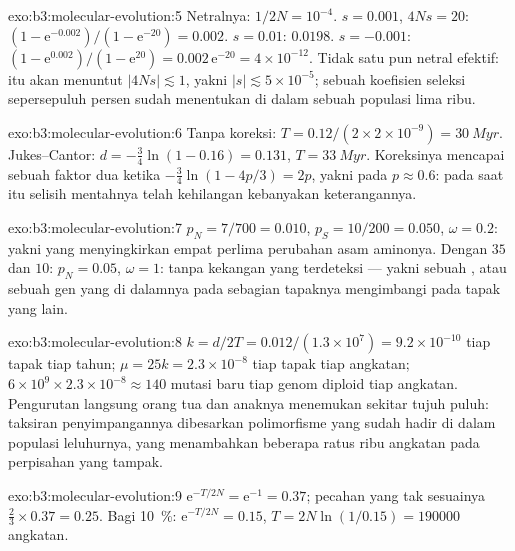 \begin{solution}{exo:b3:molecular-evolution:5}
Netralnya: $1/2N = 10^{-4}$. $s = 0.001$, $4Ns = 20$: $(1 - \mathrm{e}^{-0.002})/
(1 - \mathrm{e}^{-20}) = 0.002$. $s = 0.01$: $0.0198$. $s = -0.001$: $(1 -
\mathrm{e}^{0.002})/(1 - \mathrm{e}^{20}) = 0.002\,\mathrm{e}^{-20} =
4\times 10^{-12}$. Tidak satu pun netral efektif: itu akan menuntut $|4Ns|
\lesssim 1$, yakni $|s| \lesssim 5\times 10^{-5}$; sebuah koefisien
seleksi sepersepuluh persen sudah menentukan di dalam sebuah
populasi lima ribu.
\end{solution}

\begin{solution}{exo:b3:molecular-evolution:6}
Tanpa koreksi: $T = 0.12/(2\times 2\times 10^{-9}) = \qty{30}{Myr}$.
Jukes--Cantor: $d = -\tfrac{3}{4}\ln(1 - 0.16) = 0.131$, $T =
\qty{33}{Myr}$. Koreksinya mencapai sebuah faktor dua ketika $-\tfrac{3}{4}
\ln(1 - 4p/3) = 2p$, yakni pada $p \approx 0.6$: pada saat itu selisih mentahnya telah
kehilangan kebanyakan keterangannya.
\end{solution}

\begin{solution}{exo:b3:molecular-evolution:7}
$p_{N} = 7/700 = 0.010$, $p_{S} = 10/200 = 0.050$, $\omega = 0.2$:
yakni  yang menyingkirkan empat perlima perubahan asam aminonya. Dengan
$35$ dan $10$: $p_{N} = 0.05$, $\omega = 1$: tanpa kekangan yang terdeteksi ---
yakni sebuah , atau sebuah gen yang di dalamnya  pada sebagian tapaknya
mengimbangi  pada tapak yang lain.
\end{solution}

\begin{solution}{exo:b3:molecular-evolution:8}
$k = d/2T = 0.012/(1.3\times 10^{7}) = 9.2\times 10^{-10}$ tiap tapak tiap
tahun; $\mu = 25k = 2.3\times 10^{-8}$ tiap tapak tiap angkatan; $6\times
10^{9}\times 2.3\times 10^{-8} \approx 140$ mutasi baru tiap genom
diploid tiap angkatan. Pengurutan langsung orang tua dan anaknya menemukan
sekitar tujuh puluh: taksiran penyimpangannya dibesarkan polimorfisme
yang sudah hadir di dalam populasi leluhurnya, yang menambahkan beberapa ratus
ribu angkatan pada perpisahan yang tampak.
\end{solution}

\begin{solution}{exo:b3:molecular-evolution:9}
$\mathrm{e}^{-T/2N} = \mathrm{e}^{-1} = 0.37$; pecahan yang tak sesuainya $\tfrac{2}{3}
\times 0.37 = 0.25$. Bagi \qty{10}{\%}: $\mathrm{e}^{-T/2N} = 0.15$, $T =
2N\ln(1/0.15) = \num{190000}$ angkatan.
\end{solution}

